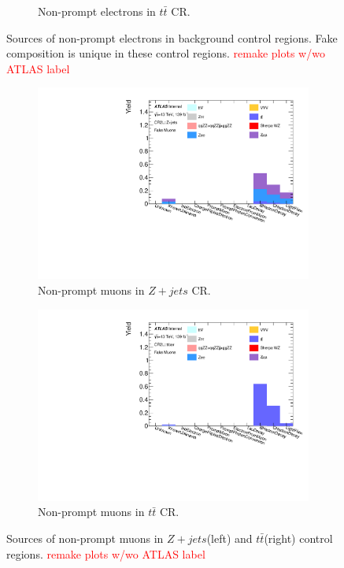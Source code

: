 \begin{figure}[ht]
\begin{subfigure}{.48\textwidth}
      \caption{Non-prompt electrons in $t\bar{t}$ CR.}
    \end{subfigure}
    \caption{Sources of non-prompt electrons in background control regions. Fake composition is unique in these control regions. \textcolor{red}{remake plots w/wo ATLAS label} \label{fig:FakeCompositionCR2LElectron}}
    \end{figure}

\begin{figure}[htb]
    \begin{subfigure}{.48\textwidth}
        \centering
        \includegraphics[width=.9\linewidth]{figures/Analysis/Background/NonPromptZplusXMuons.pdf}
        \caption{Non-prompt muons in $Z+jets$ CR.}
    \end{subfigure}
    \begin{subfigure}{.48\textwidth}
        \centering
        \includegraphics[width=.9\linewidth]{figures/Analysis/Background/NonPromptttbarMuons.pdf}
        \caption{Non-prompt muons in $t\bar{t}$ CR.}
    \end{subfigure}
        \caption{ Sources of non-prompt muons in $Z+jets$(left) and $t\bar{t}$(right) control regions. \textcolor{red}{remake plots w/wo ATLAS label} \label{fig:FakeCompositionCR2LMuon}}
\end{figure}

